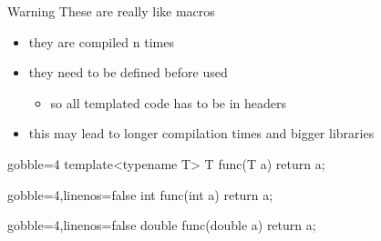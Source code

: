 \begin{frame}[fragile]
  \begin{alertblock}{Warning}
    These are really like macros
    \begin{itemize}
      \item they are compiled n times
      \item they need to be defined before used
      \begin{itemize}
        \item so all templated code has to be in headers
      \end{itemize}
      \item this may lead to longer compilation times and bigger libraries
    \end{itemize}
  \end{alertblock}
  \newsavebox{\codepiece}
  \begin{lrbox}{\codepiece}
    \begin{minipage}{.35\linewidth}
      \small
      \begin{cppcode*}{gobble=4}
        template<typename T>
        T func(T a) {
          return a;
        }
      \end{cppcode*}
    \end{minipage}
  \end{lrbox}
  \newsavebox{\codepiecea}
  \begin{lrbox}{\codepiecea}
    \begin{minipage}{.4\linewidth}
      \small
      \begin{cppcode*}{gobble=4,linenos=false}
        int func(int a) {
          return a;
        }
      \end{cppcode*}
    \end{minipage}
  \end{lrbox}
  \newsavebox{\codepieceb}
  \begin{lrbox}{\codepieceb}
    \begin{minipage}{.4\linewidth}
      \small
      \begin{cppcode*}{gobble=4,linenos=false}
        double func(double a) {
          return a;
        }
      \end{cppcode*}
    \end{minipage}
  \end{lrbox}
\end{frame}

